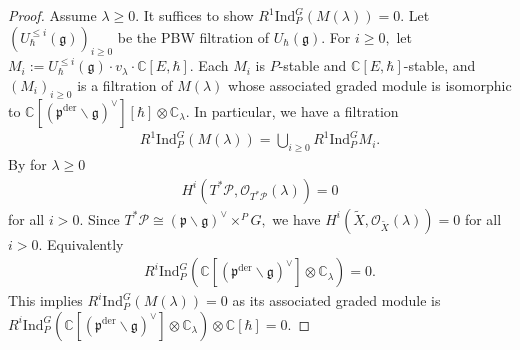 \documentclass[11pt,a4paper,usenames,dvipsnames,reqno]{amsart}
\numberwithin{equation}{section}
\newcommand{\cc}{\mathbb C}
\newcommand{\fg}{\mathfrak g}
\newcommand{\fp}{\mathfrak p}
\newcommand{\der}{\mathrm{der}}
\theoremstyle{definition}
\theoremstyle{remark}
\begin{document}
\begin{proof}
Assume $\lambda\ge 0$. It suffices to show $R^1\mathrm{Ind}_P^G(M(\lambda))=0.$ Let $(U_{\hbar}^{\le i}(\fg))_{i\ge 0}$ be the PBW filtration of $U_{\hbar}(\fg)$. For $i\ge 0,$ let $M_i:=U_{\hbar}^{\le i}(\fg)\cdot v_\lambda\cdot \cc[E,\hbar]$. Each $M_i$ is $P$-stable and $\cc[E,\hbar]$-stable, and $(M_i)_{i\ge 0}$ is a filtration of $M(\lambda)$ whose associated graded module is isomorphic to $\cc[(\fp^\der\backslash \fg)^\lor][\hbar]\otimes\cc_{\lambda}.$ In particular, we have a filtration
\begin{align*}
    R^1\mathrm{Ind}_P^G(M(\lambda))= \bigcup _{i\ge 0} R^1\mathrm{Ind}_P^G M_i.
\end{align*}
By \cite[Theorem 2.2]{Broer} for $\lambda\ge 0$
\begin{align*}
    H^i(T^\ast \mathcal{P},\mathcal{O}_{T^\ast \mathcal{P}}(\lambda))=0
\end{align*}
for all $i>0$. Since $T^\ast \mathcal{P}\cong  (\mathfrak{p}\backslash \mathfrak{g})^\lor \times^PG,$ we have $H^i(\widetilde{X} ,\mathcal{O}_{\widetilde{X}}(\lambda))=0$
for all $i>0$. Equivalently
\begin{align*}
    R^i\mathrm{Ind}_P^G(\cc[(\fp^\der\backslash \fg)^\vee]\otimes \cc_{\lambda})=0.
\end{align*}
This implies $R^i\mathrm{Ind}_P^G(M(\lambda))=0$ as
its associated graded module is  $R^i\mathrm{Ind}_P^G(\cc[(\fp^\der\backslash \fg)^\lor]\otimes\cc_{\lambda})\otimes \cc[\hbar]=0.$ 


\end{proof}
\end{document}
